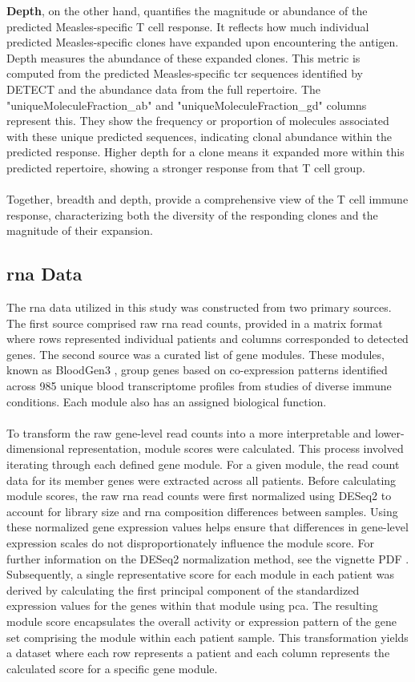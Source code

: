 \documentclass[12pt,a4paper]{report}
\begin{document}
\textbf{Depth}, on the other hand, quantifies the magnitude or abundance of the predicted Measles-specific T cell response. It reflects how much individual predicted Measles-specific clones have expanded upon encountering the antigen. Depth measures the abundance of these expanded clones. This metric is computed from the predicted Measles-specific \gls{tcr} sequences identified by DETECT and the abundance data from the full repertoire. The "uniqueMoleculeFraction\_ab" and "uniqueMoleculeFraction\_gd" columns represent this. They show the frequency or proportion of molecules associated with these unique predicted sequences, indicating clonal abundance within the predicted response. Higher depth for a clone means it expanded more within this predicted repertoire, showing a stronger response from that T cell group.\\
\\
Together, breadth and depth, provide a comprehensive view of the T cell immune response, characterizing both the diversity of the responding clones and the magnitude of their expansion.

\subsection{\acrshort{rna} Data}
\label{subsec:rna_data_construction}
The \acrshort{rna} data utilized in this study was constructed from two primary sources. The first source comprised raw \acrshort{rna} read counts, provided in a matrix format where rows represented individual patients and columns corresponded to detected genes. The second source was a curated list of gene modules. These modules, known as BloodGen3 \cite{Altman2021BloodGen3}, group genes based on co-expression patterns identified across 985 unique blood transcriptome profiles from studies of diverse immune conditions. Each module also has an assigned biological function.\\
\\
To transform the raw gene-level read counts into a more interpretable and lower-dimensional representation, module scores were calculated. This process involved iterating through each defined gene module. For a given module, the read count data for its member genes were extracted across all patients. Before calculating module scores, the raw \acrshort{rna} read counts were first normalized using DESeq2 to account for library size and \acrshort{rna} composition differences between samples. Using these normalized gene expression values helps ensure that differences in gene-level expression scales do not disproportionately influence the module score. For further information on the DESeq2 normalization method, see the vignette PDF \cite{DESeq2Manual2025}. Subsequently, a single representative score for each module in each patient was derived by calculating the first principal component of the standardized expression values for the genes within that module using \gls{pca}. The resulting module score encapsulates the overall activity or expression pattern of the gene set comprising the module within each patient sample. This transformation yields a dataset where each row represents a patient and each column represents the calculated score for a specific gene module.
\end{document}
